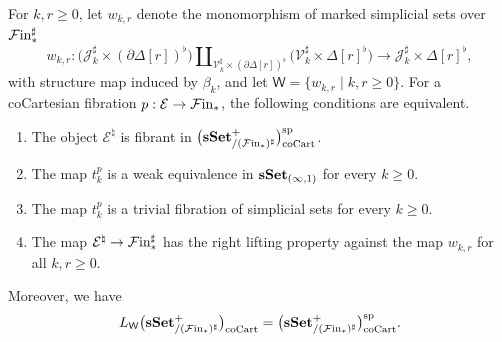 \documentclass[10pt,reqno]{amsart}
\begin{document}
\begin{proposition}
\label{prop:special_localization_explicit_lifts}
For $k,r\geq0$, let $w_{k,r}$ denote the monomorphism of marked
simplicial sets over $\mathcal{F}\mathrm{in}_*^\sharp$
\begin{equation}
\label{eq:special_boundary_localizers}
w_{k,r}:
\bigl(\mathcal J_k^\sharp\times(\partial\Delta[r])^\flat\bigr)
\amalg_{\mathcal V_k^\sharp\times(\partial\Delta[r])^\flat}
\bigl(\mathcal V_k^\sharp\times\Delta[r]^\flat\bigr) \longrightarrow
\mathcal J_k^\sharp\times\Delta[r]^\flat,
\end{equation}
with structure map induced by $\beta_k$, and let
$\mathsf W=\{w_{k,r}\mid k,r\geq0\}$. For a coCartesian fibration
$p:\mathcal E\to\mathcal{F}\mathrm{in}_*$, the following conditions are equivalent.
\begin{enumerate}[label=\textup{(\roman*)}]
\item The object $\mathcal E^\natural$ is fibrant in $\bigl(\mathbf{sSet}^+_{/(\mathcal{F}\mathrm{in}_*)^\sharp}\bigr)_{\mathrm{coCart}}^{\mathrm{sp}}$.
\item The map $t_k^p$ is a weak equivalence in
$\mathbf{sSet}_{(\infty,1)}$ for every $k\geq0$.
\item The map $t_k^p$ is a trivial fibration of simplicial sets for
every $k\geq0$.
\item The map $\mathcal E^\natural\to\mathcal{F}\mathrm{in}_*^\sharp$ has the right
lifting property against the map $w_{k,r}$ for all $k,r\geq0$.
\end{enumerate}
Moreover, we have
\[
L_{\mathsf W}\bigl(\mathbf{sSet}^+_{/(\mathcal{F}\mathrm{in}_*)^\sharp}\bigr)_{\mathrm{coCart}}=\bigl(\mathbf{sSet}^+_{/(\mathcal{F}\mathrm{in}_*)^\sharp}\bigr)_{\mathrm{coCart}}^{\mathrm{sp}}.
\]
\end{proposition}
\end{document}
